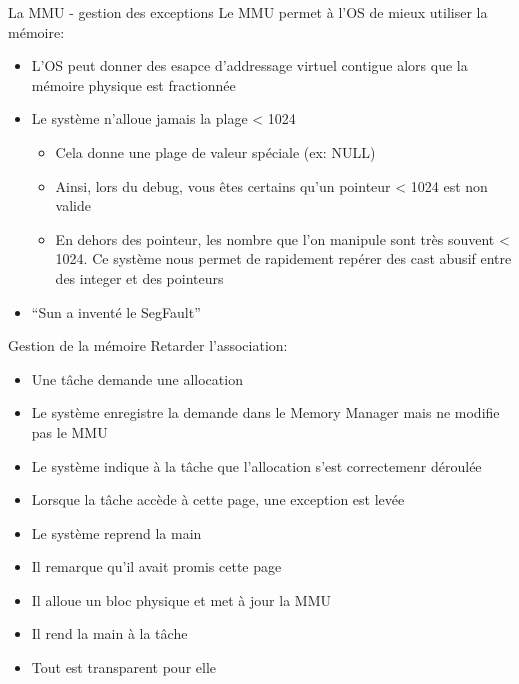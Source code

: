 \begin{frame}{La MMU - gestion des exceptions}
  Le MMU permet à l'OS de mieux utiliser la mémoire:
  \begin{itemize} 
  \item  L'OS peut  donner  des esapce  d'addressage virtuel  contigue
    alors que la mémoire physique est fractionnée
  \item Le système n'alloue jamais la plage < 1024
    \begin{itemize}
    \item Cela donne une plage de valeur spéciale (ex: NULL)
    \item Ainsi,  lors du debug,  vous êtes certains qu'un  pointeur <
      1024 est non valide
    \item En  dehors des pointeur,  les nombre que l'on  manipule sont
      très  souvent <  1024.   Ce système  nous  permet de  rapidement
      repérer des cast abusif entre des integer et des pointeurs
    \end{itemize} 
  \item ``Sun a inventé le SegFault''
  \end{itemize} 
\end{frame}

\begin{frame}{Gestion de la mémoire}
  Retarder l'association:
  \begin{itemize}
  \item Une tâche demande une allocation
  \item Le système  enregistre la demande dans le  Memory Manager mais
    ne modifie pas le MMU
  \item  Le  système  indique   à  la  tâche  que  l'allocation  s'est
    correctemenr déroulée
  \item Lorsque la tâche accède à cette page, une exception est levée
  \item Le système reprend la main
  \item Il remarque qu'il avait promis cette page
  \item Il alloue un bloc physique et met à jour la MMU
  \item Il rend la main à la tâche
  \item Tout est transparent pour elle
  \end{itemize}
\end{frame}

